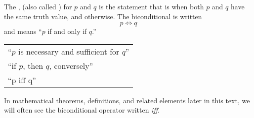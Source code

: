 \begin{defn}
  The ,
  (also called )
  for $p$ and $q$ is the statement that is \ltrue{}
  when both $p$ and $q$ have the same truth value,
  and \lfalse{} otherwise.
  The biconditional is written
  \begin{equation}
    p \iff q
    \label{eq:propositional:biconditional}
  \end{equation}
  and means
  ``$p$ if and only if $q$.''
\end{defn}

\begin{table}[h]
  \centering
    \begin{tabular}{l}
      ``\(p\) is necessary and sufficient for \(q\)'' \\
      ``if \(p\), then \(q\), conversely'' \\
      ``p iff q''
    \end{tabular}
  \label{tab:biconditionals}
\end{table}
In mathematical theorems, definitions, and related elements later in this text, we will often see the biconditional operator written \emph{iff}.

